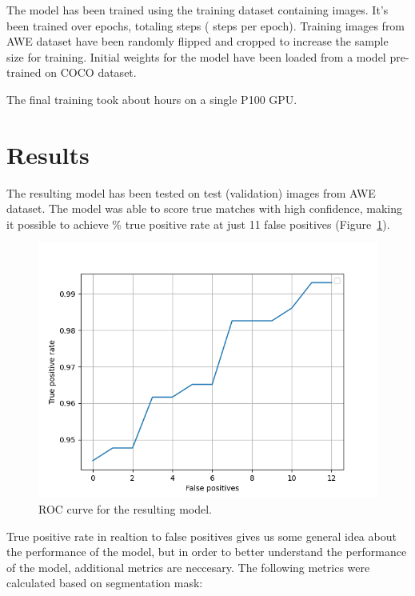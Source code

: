 \documentclass[9pt]{IEEEtran}
\begin{document}
The model has been trained using the training dataset containing  images. It's been trained over  epochs, totaling  steps ( steps per epoch). Training images from AWE dataset have been randomly flipped and cropped to increase the sample size for training. Initial weights for the model have been loaded from a model pre-trained on COCO dataset.

The final training took about  hours on a single P100 GPU.

\section{Results}

The resulting model has been tested on  test (validation) images from AWE dataset. The model was able to score true matches with high confidence, making it possible to achieve \% true positive rate at just 11 false positives (Figure~\ref{fig:roc}).

\begin{figure}[h]
    \centering
    \includegraphics[width=1\columnwidth]{roc.png}
    \caption{ROC curve for the resulting model.}
    \label{fig:roc}
\end{figure}

True positive rate in realtion to false positives gives us some general idea about the performance of the model, but in order to better understand the performance of the model, additional metrics are neccesary. The following metrics were calculated based on segmentation mask:
\end{document}
